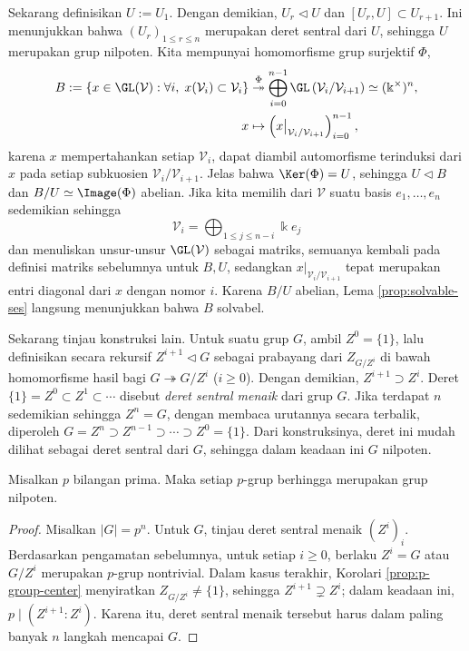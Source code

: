 \begin{example}
	Sekarang definisikan $U := U_1$. Dengan demikian, $U_r \lhd U$ dan $[U_r, U] \subset U_{r+1}$. Ini menunjukkan bahwa $(U_r)_{1 \leq r \leq n}$ merupakan deret sentral dari $U$, sehingga $U$ merupakan grup nilpoten. Kita mempunyai homomorfisme grup surjektif $\Phi$,
	\begin{align*}
		B := \left\{ x \in \GL(\mathcal{V}): \forall i, \; x (\mathcal{V}_i) \subset \mathcal{V}_i \right\} & \stackrel{\Phi}{\twoheadrightarrow} \bigoplus_{i=0}^{n-1} \GL\left( \mathcal{V}_i/\mathcal{V}_{i+1} \right) \simeq (\Bbbk^\times)^n, \\
		x & \mapsto \left( x \big|_{\mathcal{V}_i/\mathcal{V}_{i+1}} \right)_{i=0}^{n-1} ,
	\end{align*}
	karena $x$ mempertahankan setiap $\mathcal{V}_i$, dapat diambil automorfisme terinduksi dari $x$ pada setiap subkuosien $\mathcal{V}_i/\mathcal{V}_{i+1}$. Jelas bahwa $\Ker(\Phi) = U$, sehingga $U \lhd B$ dan $B/U \simeq \Image(\Phi)$ abelian. Jika kita memilih dari $\mathcal{V}$ suatu basis $e_1, \ldots, e_n$ sedemikian sehingga
	\[ \mathcal{V}_i = \bigoplus_{1 \leq j \leq n-i} \Bbbk e_j \]
	dan menuliskan unsur-unsur $\GL(\mathcal{V})$ sebagai matriks, semuanya kembali pada definisi matriks sebelumnya untuk $B,U$, sedangkan $x|_{\mathcal{V}_i/\mathcal{V}_{i+1}}$ tepat merupakan entri diagonal dari $x$ dengan nomor $i$. Karena $B/U$ abelian, Lema \ref{prop:solvable-ses} langsung menunjukkan bahwa $B$ solvabel.
\end{example}

Sekarang tinjau konstruksi lain. Untuk suatu grup $G$, ambil $Z^0 = \{1\}$, lalu definisikan secara rekursif $Z^{i+1} \lhd G$ sebagai prabayang dari $Z_{G/Z^i}$ di bawah homomorfisme hasil bagi $G \twoheadrightarrow G/Z^i$ ($i \geq 0$). Dengan demikian, $Z^{i+1} \supset Z^i$. Deret $\{1\} = Z^0 \subset Z^1 \subset \cdots$ disebut \emph{deret sentral menaik} dari grup $G$. Jika terdapat $n$ sedemikian sehingga $Z^n = G$, dengan membaca urutannya secara terbalik, diperoleh $G = Z^n \supset Z^{n-1} \supset \cdots \supset Z^0 = \{1\}$. Dari konstruksinya, deret ini mudah dilihat sebagai deret sentral dari $G$, sehingga dalam keadaan ini $G$ nilpoten.

\begin{proposition}\label{prop:p-group-nilpotent}
	Misalkan $p$ bilangan prima. Maka setiap $p$-grup berhingga merupakan grup nilpoten.
\end{proposition}
\begin{proof}
	Misalkan $|G|=p^n$. Untuk $G$, tinjau deret sentral menaik $(Z^i)_i$. Berdasarkan pengamatan sebelumnya, untuk setiap $i \geq 0$, berlaku $Z^i = G$ atau $G/Z^i$ merupakan $p$-grup nontrivial. Dalam kasus terakhir, Korolari \ref{prop:p-group-center} menyiratkan $Z_{G/Z^i} \neq \{1\}$, sehingga $Z^{i+1} \supsetneq Z^i$; dalam keadaan ini, $p \mid (Z^{i+1} : Z^i)$. Karena itu, deret sentral menaik tersebut harus dalam paling banyak $n$ langkah mencapai $G$.
\end{proof}

